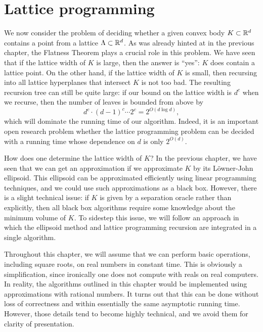 %
%
%

\chapter{Lattice programming}

We now consider the problem of deciding whether a given convex body $K \subset \mathbb{R}^d$
contains a point from a lattice $\Lambda \subset \mathbb{R}^d$.
As was already hinted at in the previous chapter,
the Flatness Theorem plays a crucial role in this problem.
We have seen that if the lattice width of $K$ is large,
then the answer is ``yes'': $K$ does contain a lattice point.
On the other hand,
if the lattice width of $K$ is small,
then recursing into all lattice hyperplanes that intersect $K$ is not too bad.
The resulting recursion tree can still be quite large:
if our bound on the lattice width is $d^c$ when we recurse,
then the number of leaves is bounded from above by
\[
  d^c \cdot (d-1)^c \cdots 2^c = 2^{O(d \log d)},
\]
which will dominate the running time of our algorithm.
Indeed, it is an important open research problem
whether the lattice programming problem can be decided
with a running time whose dependence on $d$ is only $2^{O(d)}$.

How does one determine the lattice width of $K$?
In the previous chapter,
we have seen that we can get an approximation if we approximate $K$ by its Löwner-John ellipsoid.
This ellipsoid can be approximated efficiently using linear programming techniques,
and we could use such approximations as a black box.
However, there is a slight technical issue:
if $K$ is given by a separation oracle rather than explicitly,
then all black box algorithms require some knowledge about the minimum volume of $K$.
To sidestep this issue,
we will follow an approach in which the
ellipsoid method and lattice programming recursion are integrated in a single algorithm.

Throughout this chapter, we will assume that we can perform basic operations, including square roots,
on real numbers in constant time.
This is obviously a simplification,
since ironically one does not compute with reals on real computers.
In reality, the algorithms outlined in this chapter would be implemented using approximations with rational numbers.
It turns out that this can be done without loss of correctness and within essentially the same asymptotic running time.
However, those details tend to become highly technical, and we avoid them for clarity of presentation.



